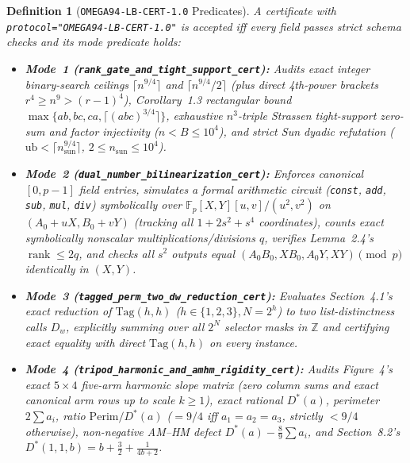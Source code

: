 \documentclass[10pt,twocolumn]{article}
\newtheorem{definition}{Definition}
\newcommand{\ZZ}{\mathbb{Z}}
\newcommand{\FF}{\mathbb{F}}
\begin{document}
{\begin{definition}[\texttt{OMEGA94-LB-CERT-1.0} Predicates]\label{def:cert}
\normalfont A certificate with \texttt{protocol="OMEGA94-\allowbreak LB-\allowbreak CERT-1.0"} is accepted iff every field passes strict schema checks and its mode predicate holds:
\begin{itemize}[leftmargin=1.2em,itemsep=1pt,topsep=2pt]
  \item \textbf{Mode~1 (\texttt{rank\_\allowbreak gate\_\allowbreak and\_\allowbreak tight\_\allowbreak support\_\allowbreak cert}):} Audits exact integer binary-search ceilings $\lceil n^{9/4}\rceil$ and $\lceil n^{9/4}/2\rceil$ (plus direct 4th-power brackets $r^4\ge n^9 > (r-1)^4$), Corollary~1.3 rectangular bound $\max\{ab,bc,ca,\lceil(abc)^{3/4}\rceil\}$, exhaustive $n^3$-triple Strassen tight-support zero-sum and factor injectivity ($n<B\le 10^4$), and strict Sun dyadic refutation ($\mathrm{ub} < \lceil n_{\mathrm{sun}}^{9/4}\rceil$, $2\le n_{\mathrm{sun}}\le 10^4$).
  \item \textbf{Mode~2 (\texttt{dual\_\allowbreak number\_\allowbreak bilinearization\_\allowbreak cert}):} Enforces canonical $[0,p{-}1]$ field entries, simulates a formal arithmetic circuit (\texttt{const}, \texttt{add}, \texttt{sub}, \texttt{mul}, \texttt{div}) \emph{symbolically} over $\FF_p[X,Y][u,v]/(u^2,v^2)$ on $(A_0{+}uX,B_0{+}vY)$ (tracking all $1+2s^2+s^4$ coordinates), counts exact symbolically nonscalar multiplications/divisions $q$, verifies Lemma~2.4's $\operatorname{rank}\le 2q$, and checks all $s^2$ outputs equal $(A_0 B_0, X B_0, A_0 Y, X Y)\pmod p$ identically in $(X,Y)$.
  \item \textbf{Mode~3 (\texttt{tagged\_\allowbreak perm\_\allowbreak two\_\allowbreak dw\_\allowbreak reduction\_\allowbreak cert}):} Evaluates Section~4.1's exact reduction of $\mathrm{Tag}(h,h)$ ($h\in\{1,2,3\}, N=2^h$) to two list-distinctness calls $D_w$, explicitly summing over all $2^N$ selector masks in $\ZZ$ and certifying exact equality with direct $\mathrm{Tag}(h,h)$ on every instance.
  \item \textbf{Mode~4 (\texttt{tripod\_\allowbreak harmonic\_\allowbreak and\_\allowbreak amhm\_\allowbreak rigidity\_\allowbreak cert}):} Audits Figure~4's exact $5{\times}4$ five-arm harmonic slope matrix (zero column sums and exact canonical arm rows up to scale $k\ge 1$), exact rational $D^*(a)$, perimeter $2\sum a_i$, ratio $\mathrm{Perim}/D^*(a)$ ($=9/4$ iff $a_1=a_2=a_3$, strictly $<9/4$ otherwise), non-negative AM--HM defect $D^*(a)-\frac{8}{9}\sum a_i$, and Section~8.2's $D^*(1,1,b)=b+\frac{3}{2}+\frac{1}{4b+2}$.
\end{itemize}
\end{definition}}
\end{document}
